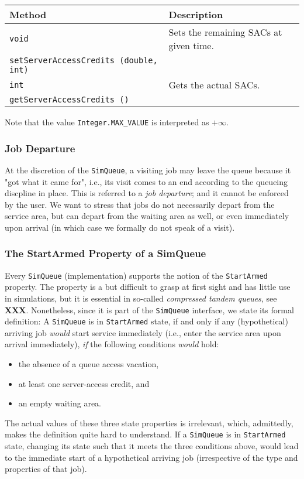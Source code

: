 \documentclass[12pt]{book}
\begin{document}
\begin{tabular}{|l|l|}
  \hline
  {\bf Method} & {\bf Description} \\
  \hline
  \lstinline[basicstyle=\footnotesize]!void!
    & Sets the remaining SACs at given time.
    \\
  \lstinline[basicstyle=\footnotesize]!setServerAccessCredits (double, int)!
    &
    \\ \hline
  \lstinline[basicstyle=\footnotesize]!int!
    & Gets the actual SACs.
    \\
  \lstinline[basicstyle=\footnotesize]!getServerAccessCredits ()!
    &
    \\ \hline
\end{tabular}

Note that the value \lstinline-Integer.MAX_VALUE- is interpreted as $+\infty$.

\subsubsection{Job Departure}

At the discretion of the \lstinline|SimQueue|,
  a visiting job may leave the queue
  because it "got what it came for",
  i.e.,
  its visit comes to an end
  according to the queueing discpline in place.
This is referred to a {\em job departure\/};
  and it cannot be enforced by the user.
We want to stress that jobs do not necessarily
  depart from the service area,
  but can depart from the waiting area as well,
  or even immediately upon arrival
  (in which case we formally do not speak of a visit).

\subsubsection{The StartArmed Property of a SimQueue}

Every \lstinline|SimQueue| (implementation) supports the notion of the
  \lstinline|StartArmed| property.
The property is a but difficult to grasp at first sight
  and has little use in simulations,
  but it is essential in so-called {\em compressed tandem queues},
  see {\bf XXX}.
Nonetheless, since it is part of the \lstinline-SimQueue- interface,
  we state its formal definition:
A \lstinline-SimQueue- is in \lstinline-StartArmed- state,
  if and only if any (hypothetical) arriving job {\em would\/} start service immediately
  (i.e., enter the service area upon arrival immediately),
  {\em if\/} the following conditions {\em would\/} hold:
\begin{itemize}
\item the absence of a queue access vacation,
\item at least one server-access credit, and
\item an empty waiting area. 
\end{itemize}
The actual values of these three state properties is irrelevant,
  which, admittedly, makes the definition quite hard to understand.
If a \lstinline-SimQueue- is in \lstinline-StartArmed- state,
  changing its state such that it meets the three conditions above,
  would lead to the immediate start of a hypothetical arriving job
  (irrespective of the type and properties of that job).
\end{document}
